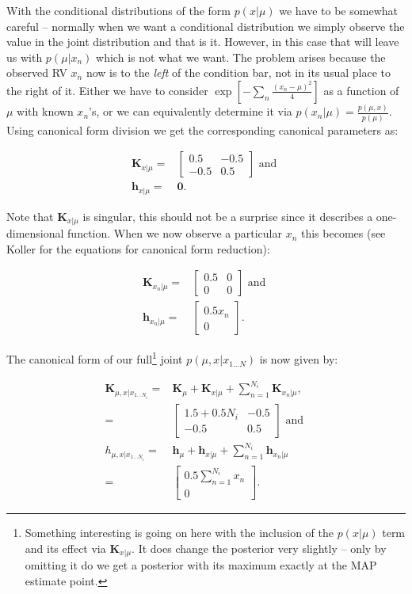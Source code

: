 With the conditional distributions of the form $p(x|\mu)$ we have to
be somewhat careful -- normally when we want a conditional
distribution we simply observe the value in the joint distribution and
that is it. However, in this case that will leave us with
$p(\mu|x_{n})$ which is not what we want. The problem arises because
the observed RV $x_{n}$ now is to the \emph{left} of the condition
bar, not in its usual place to the right of it. Either we have to
consider $\exp\left[-\sum_{n}\frac{(x_{n}-\mu)^{2}}{4}\right]$ as a
function of $\mu$ with known $x_{n}$'s, or we can equivalently
determine it via $p(x_{n}|\mu)=\frac{p(\mu,x)}{p(\mu)}.$ Using
canonical form division we get the corresponding canonical parameters
as:

\begin{align*}
\bm{K}_{x|\mu}= & \left[\begin{array}{cc}
0.5 & -0.5\\
-0.5 & 0.5
\end{array}\right]\mbox{ and }\\
\bm{h}_{x|\mu}= & \bm{0}.
\end{align*}


Note that $\bm{K}_{x|\mu}$ is singular, this should not be a surprise
since it describes a one-dimensional function. When we now observe a
particular $x_{n}$ this becomes (see Koller for the equations for
canonical form reduction):

\begin{align*}
\bm{K}_{x_{n}|\mu}= & \left[\begin{array}{cc}
0.5 & 0\\
0 & 0
\end{array}\right]\mbox{ and }\\
\bm{h}_{x_{n}|\mu}= & \left[\begin{array}{c}
0.5x_{n}\\
0
\end{array}\right].
\end{align*}

The canonical form of our full\footnote{Something interesting is
going on here with the inclusion of the $p(x|\mu)$ term and its effect
via $\bm{K}_{x|\mu}$. It does change the posterior very slightly --
only by omitting it do we get a posterior with its maximum exactly at
the MAP estimate point.} joint $p(\mu,x|x_{1\ldots N})$ is now given
by:

\begin{align*}
\bm{K}_{\mu,x|x_{1\dots N_{i}}}= & \bm{K}_{\mu}+\bm{K}_{x|\mu}+\sum_{n=1}^{N_{i}}\bm{K}_{x_{n}|\mu},\\
= & \left[\begin{array}{cc}
1.5+0.5N_{i} & -0.5\\
-0.5 & 0.5
\end{array}\right]\mbox{ and }\\
h_{\mu,x|x_{1\dots N_{i}}}= & \bm{h}_{\mu}+\bm{h}_{x|\mu}+\sum_{n=1}^{N_{i}}\bm{h}_{x_{n}|\mu}\\
= & \left[\begin{array}{c}
0.5\sum_{n=1}^{N_{i}}x_{n}\\
0
\end{array}\right].
\end{align*}


